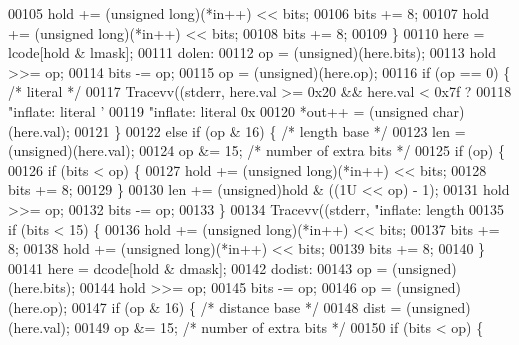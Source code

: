 \begin{DoxyCode}
{00105             hold += (\textcolor{keywordtype}{unsigned} long)(*in++) << bits;
00106             bits += 8;
00107             hold += (\textcolor{keywordtype}{unsigned} long)(*in++) << bits;
00108             bits += 8;
00109         \}
00110         here = lcode[hold & lmask];
00111       dolen:
00112         op = (unsigned)(here.bits);
00113         hold >>= op;
00114         bits -= op;
00115         op = (unsigned)(here.op);
00116         \textcolor{keywordflow}{if} (op == 0) \{                          \textcolor{comment}{/* literal */}
00117             Tracevv((stderr, here.val >= 0x20 && here.val < 0x7f ?
00118                     \textcolor{stringliteral}{"inflate:         literal '%
00119                     \textcolor{stringliteral}{"inflate:         literal 0x%
00120             *out++ = (\textcolor{keywordtype}{unsigned} char)(here.val);
00121         \}
00122         \textcolor{keywordflow}{else} \textcolor{keywordflow}{if} (op & 16) \{                     \textcolor{comment}{/* length base */}
00123             len = (unsigned)(here.val);
00124             op &= 15;                           \textcolor{comment}{/* number of extra bits */}
00125             \textcolor{keywordflow}{if} (op) \{
00126                 \textcolor{keywordflow}{if} (bits < op) \{
00127                     hold += (\textcolor{keywordtype}{unsigned} long)(*in++) << bits;
00128                     bits += 8;
00129                 \}
00130                 len += (unsigned)hold & ((1U << op) - 1);
00131                 hold >>= op;
00132                 bits -= op;
00133             \}
00134             Tracevv((stderr, \textcolor{stringliteral}{"inflate:         length %
00135             \textcolor{keywordflow}{if} (bits < 15) \{
00136                 hold += (\textcolor{keywordtype}{unsigned} long)(*in++) << bits;
00137                 bits += 8;
00138                 hold += (\textcolor{keywordtype}{unsigned} long)(*in++) << bits;
00139                 bits += 8;
00140             \}
00141             here = dcode[hold & dmask];
00142           dodist:
00143             op = (unsigned)(here.bits);
00144             hold >>= op;
00145             bits -= op;
00146             op = (unsigned)(here.op);
00147             \textcolor{keywordflow}{if} (op & 16) \{                      \textcolor{comment}{/* distance base */}
00148                 dist = (unsigned)(here.val);
00149                 op &= 15;                       \textcolor{comment}{/* number of extra bits */}
00150                 \textcolor{keywordflow}{if} (bits < op) \{
}}}}
\end{DoxyCode}
